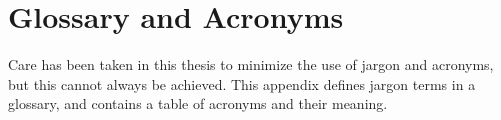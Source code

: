 \chapter{Glossary and Acronyms}
\label{app_glossary}
Care has been taken in this thesis to minimize the use of jargon and
acronyms, but this cannot always be achieved.  This appendix defines
jargon terms in a glossary, and contains a table of acronyms and their
meaning.

